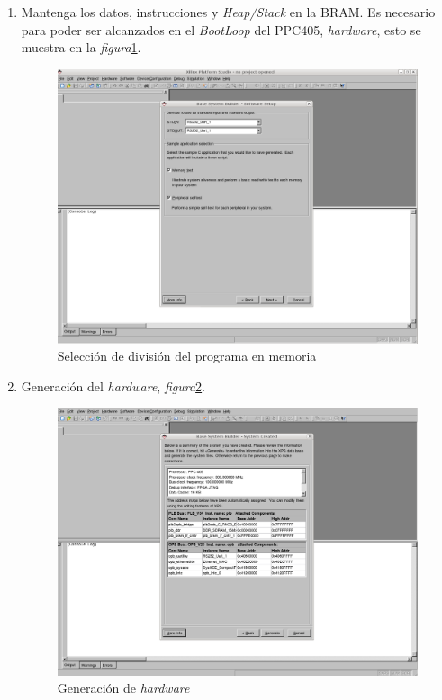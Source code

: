 \begin{enumerate}
  
\item Mantenga los datos, instrucciones y \emph{Heap/Stack} en la BRAM. Es
necesario para poder ser alcanzados en el \emph{BootLoop} del PPC405,
\emph{hardware}, esto se muestra en la
\emph{figura}\ref{Selección de división del programa en memoria}.
  \begin{figure}[h!] 
  \centering
  \includegraphics[scale=.25]{./figuras/EDK11.png}
  \caption{Selección de división del programa en memoria}
  \label{Selección de división del programa en memoria}
  \end{figure}
  
  
\item Generación del \emph{hardware}, \emph{figura}\ref{Generación de hardware}.
  \begin{figure}[h!] 
  \centering
  \includegraphics[scale=.25]{./figuras/EDK13.png}
  \caption{Generación de \emph{hardware} }
  \label{Generación de hardware}
  \end{figure}
  

\end{enumerate}
